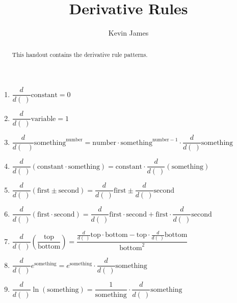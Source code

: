 \documentclass[handout,nooutcomes,noauthor,12pt]{ximera}
\author{Kevin James}
\title{Derivative Rules}
\begin{document}
	\begin{abstract}
		This handout contains the derivative rule patterns.
	\end{abstract}
	\maketitle
	\begin{enumerate}[label=\arabic*.]
		\item $\dfrac{d}{d ( \ )}\text{constant} = 0$
		\vspace{5mm}
		\item $ \dfrac{d}{d( \ )} \text{variable} = 1 $
		\vspace{5mm}
		\item $ \dfrac{d}{d(\text{ })} \text{something}^\text{number} = \text{number} \cdot \text{something}^{\text{number}-1} \cdot \dfrac{d}{d( \ )} \text{something} $
		\vspace{5mm}
		\item $ \dfrac{d}{d ( \ )} \left(\text{constant} \cdot \text{something}\right) = \text{constant} \cdot \dfrac{d}{d ( \ )}(\text{something}) $
		\item $\dfrac{d}{d ( \ )}\left(\text{first} \pm \text{second} \right) = \dfrac{d}{d ( \ )} \text{first} \pm \dfrac{d}{d ( \ )} \text{second}$
		\vspace{5mm}
		\item $\dfrac{d}{d ( \ )}\left(\text{first} \cdot \text{second} \right) = \dfrac{d}{d ( \ )} \text{first} \cdot \text{second} + \text{first} \cdot \dfrac{d}{d ( \ )} \text{second}$
		\vspace{5mm}
		\item $ \dfrac{d}{d ( \ )} \left( \dfrac{\text{top}}{\text{bottom}} \right) = \dfrac{\frac{d}{d( \ )} \text{top} \cdot \text{bottom} - \text{top} \cdot \frac{d}{d( \ )}\text{bottom}}{\text{bottom}^2} $
		\vspace{5mm}
		\item $ \dfrac{d}{d( \ )} e^{\text{something}} = e^{\text{something}} \cdot \dfrac{d}{d( \ )} \text{something} $
		\vspace{5mm}
		\item $ \dfrac{d}{d( \ )} \ln(\text{something}) = \dfrac{1}{\text{something}} \cdot \dfrac{d}{d( \ )} \text{something} $
		\vspace{5mm}
		
		\clearpage
		

\end{enumerate}
\end{document}
